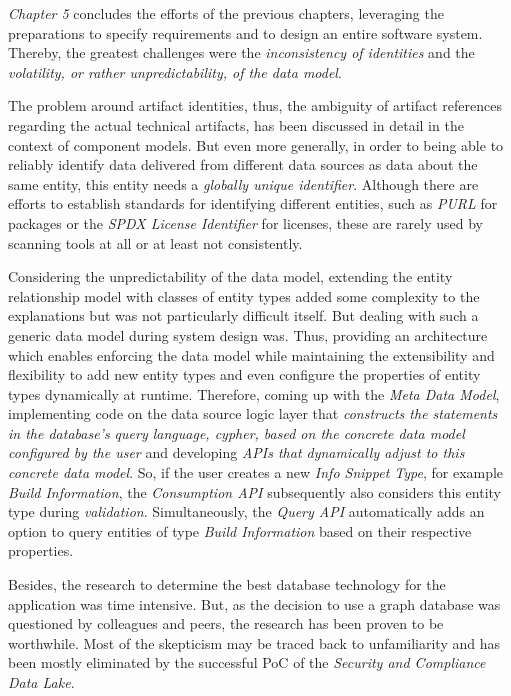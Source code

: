\emph{Chapter 5} concludes the efforts of the previous chapters, leveraging the preparations to specify requirements and to design an entire software system. Thereby, the greatest challenges were the \emph{inconsistency of identities} and the \emph{volatility, or rather unpredictability, of the data model}.\par
The problem around artifact identities, thus, the ambiguity of artifact references regarding the actual technical artifacts, has been discussed in detail in the context of component models. But even more generally, in order to being able to reliably identify data delivered from different data sources as data about the same entity, this entity needs a \emph{globally unique identifier}. Although there are efforts to establish standards for identifying different entities, such as \emph{PURL} for packages or the \emph{SPDX License Identifier} for licenses, these are rarely used by scanning tools at all or at least not consistently.\par
Considering the unpredictability of the data model, extending the entity relationship model with classes of entity types added some complexity to the explanations but was not particularly difficult itself. But dealing with such a generic data model during system design was. Thus,  providing an architecture which enables enforcing the data model while maintaining the extensibility and flexibility to add new entity types and even configure the properties of entity types dynamically at runtime. Therefore, coming up with the \emph{Meta Data Model}, implementing code on the data source logic layer that \emph{constructs the statements in the database's query language, cypher, based on the concrete data model configured by the user} and developing \emph{APIs that dynamically adjust to this concrete data model}. So, if the user creates a new \emph{Info Snippet Type}, for example \emph{Build Information}, the \emph{Consumption API} subsequently also considers this entity type during \emph{validation}. Simultaneously, the \emph{Query API} automatically adds an option to query entities of type \emph{Build Information} based on their respective properties.\par
Besides, the research to determine the best database technology for the application was time intensive. But, as the decision to use a graph database was questioned by colleagues and peers, the research has been proven to be worthwhile. Most of the skepticism may be traced back to unfamiliarity and has been mostly eliminated by the successful PoC of the \emph{Security and Compliance Data Lake}.\\


